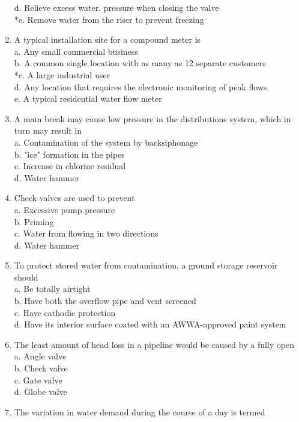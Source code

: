 \begin{enumerate}[1.]
d. Relieve excess water. pressure when closing the valve\\
*e. Remove water from the riser to prevent freezing\\
\item A typical installation site for a compound meter is\\
a. Any small commercial business\\
b. A common single location with as many as 12 separate customers\\
*c. A large industrial user\\
d. Any location that requires the electronic monitoring of peak flows\\
e. A typical residential water flow meter\\
\item A main break may cause low pressure in the distributions system, which in turn may result in\\
a. Contamination of the system by backsiphonage\\
b. "ice" formation in the pipes\\
c. Increase in chlorine residual\\
d. Water hammer\\
\item Check valves are used to prevent\\
a. Excessive pump pressure\\
b. Priming\\
c. Water from flowing in two directions\\
d. Water hammer 
\item To protect stored water from contamination, a ground storage reservoir should\\
a. Be totally airtight\\
b. Have both the overflow pipe and vent screened\\
c. Have cathodic protection\\
d. Have its interior surface coated with an AWWA-approved paint system\\
\item The least amount of head loss in a pipeline would be caused by a fully open\\
a. Angle valve\\
b. Check valve\\
c. Gate valve\\
d. Globe valve\\
\item The variation in water demand during the course of a day is termed\\

\end{enumerate}
